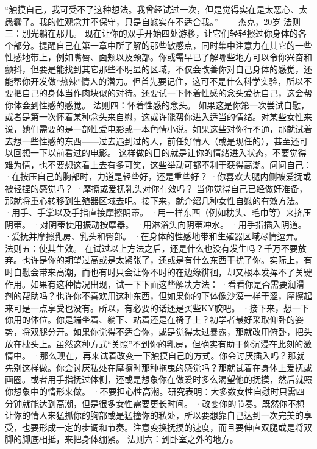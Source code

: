 \documentclass[12pt,UTF8]{ctexbook}
\begin{document}
“触摸自己，我可受不了这种想法。我曾经试过一次，但是觉得实在是太恶心、太愚蠢了。我的性观念并不保守，只是自慰实在不适合我。”
——杰克，20岁
法则三：别光躺在那儿。
现在让你的双手开始四处游移，让它们轻轻擦过你身体的各个部分。提醒自己在第一章中所了解的那些敏感点，同时集中注意力在其它的一些性感地带上，例如嘴唇、面颊以及颈部。你或需早已了解哪些地方可以令你兴奋和颤抖，但要是能找到其它那些不明显的区域，不仅会改善你对自己身体的感觉，还能帮你开发做“热辣”情人的潜力。但首先要记住，这可不是什么科学实验，所以不要把自己的身体当作肉块似的对待。还要试一下怀着性感的念头爱抚自己，这会帮你体会到性感的感觉。
法则四：怀着性感的念头。
如果这是你第一次尝试自慰，或者是第一次怀着某种念头来自慰，这或许能帮你进入适当的情绪。对某些女性来说，她们需要的是一部性爱电影或一本色情小说。如果这些对你行不通，那就试着去想一些性感的东西——过去遇到过的人，前任好情人（或是现任的），甚至还可以回想一下以前看过的电影。
这样做的目的就是让你的情绪进入状态，不要觉得难为情，也不要想这看上去有多可笑，这些举动可都不利于获得高潮。问问自己：
·在按压自己的胸部时，力道是轻些好，还是重些好？
·你喜欢大腿内侧被爱抚或被轻捏的感觉吗？
·摩擦或爱抚乳头对你有效吗？
当你觉得自己已经做好准备，那就将重心转移到生殖器区域去吧。接下来，就介绍几种女性自慰的有效方法。
·用手、手掌以及手指直接摩擦阴蒂。
·用一样东西（例如枕头、毛巾等）来挤压阴蒂。
·对阴蒂使用振动按摩器。
·用淋浴头向阴蒂冲水。
·用手指插入阴道。
·爱抚并摩擦乳房、乳头和臀部。
·在身体的性感地带和生殖器区域尽情逗弄。
法则五：使其生效。
在试过以上方法之后，还是什么也没有发生吗？千万不要放弃。也许是你的期望过高或是太紧张了，还或是有什么东西干扰了你。实际上，有时自慰会带来高潮，而也有时只会让你不时的在边缘徘徊，却又根本发挥不了关键作用。如果有这种情况出现，试一下下面这些解决方法：
·看看你是否需要润滑剂的帮助吗？也许你不喜欢用这种东西，但如果你的下体像沙漠一样干涩，摩擦起来可是一点享受也没有。所以，有必要的话还是买些KY胶吧。
·接下来，想一下你用的体位。你是端坐着、躺下、站着还是在椅子上？初学者最好采取仰卧的姿势，将双腿分开。如果你觉得不适合你，或是觉得太过暴露，那就改用俯卧，把头放在枕头上。虽然这种方式“关照”不到你的乳房，但确实有助于你沉浸在此刻的激情中。
·那么现在，再来试着改变一下触摸自己的方式。你会讨厌插入吗？那就先别这样做。你会讨厌私处在摩擦时那种拖曳的感觉吗？那就试着在身体上爱抚或画圈。或者用手指抚过体侧，还或是想象你在做爱时多么渴望他的抚摸，然后就照你想象中的情形来做。
·不要担心性高潮。研究表明：大多数女性自慰时只需四分钟就能达到高潮，但是很多女性需要更长时间。
·改变你的节奏。既然你不想让你的情人来猛抓你的胸部或是猛撞你的私处，所以要想靠自己达到一次完美的享受，也要形成一定的步调和节奏。注意变换抚摸的速度，而且要伸直双腿或是将双脚的脚底相抵，来把身体绷紧。
法则六：到卧室之外的地方。
\end{document}
